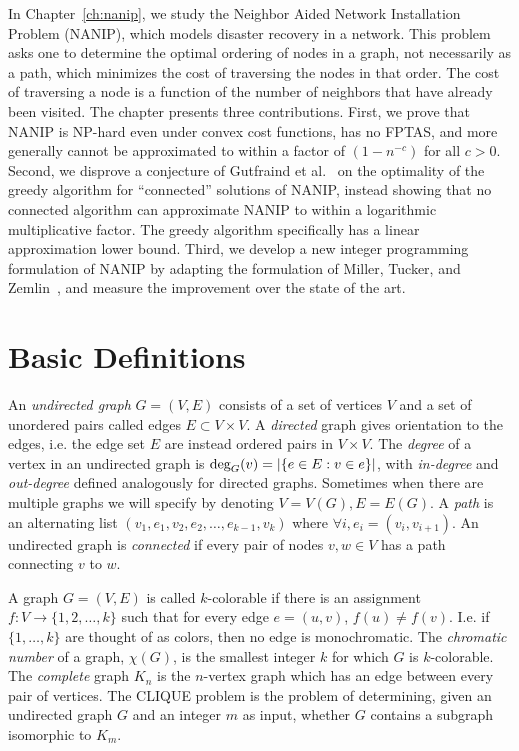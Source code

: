 In Chapter~\ref{ch:nanip}, we study the Neighbor Aided Network Installation
Problem (NANIP), which models disaster recovery in a network. This problem asks
one to determine the optimal ordering of nodes in a graph, not necessarily as a
path, which minimizes the cost of traversing the nodes in that order. The cost
of traversing a node is a function of the number of neighbors that have already
been visited. The chapter presents three contributions. First, we prove that
NANIP is NP-hard even under convex cost functions, has no FPTAS, and more
generally cannot be approximated to within a factor of $(1-n^{-c})$ for all
$c>0$. Second, we disprove a conjecture of Gutfraind et al.~\cite{Gutfraind14}
on the optimality of the greedy algorithm for ``connected'' solutions of NANIP,
instead showing that no connected algorithm can approximate NANIP to within a
logarithmic multiplicative factor. The greedy algorithm specifically has a
linear approximation lower bound. Third, we develop a new integer programming
formulation of NANIP by adapting the formulation of Miller, Tucker, and
Zemlin~\cite{miller1960integer}, and measure the improvement over the state of
the art.~\cite{Gutfraind14}
 
\section{Basic Definitions}

An \emph{undirected graph} $G = (V,E)$ consists of a set of vertices $V$ and a
set of unordered pairs called edges $E \subset V \times V$. A \emph{directed}
graph gives orientation to the edges, i.e. the edge set $E$ are instead ordered
pairs in $V \times V$. The \emph{degree} of a vertex in an undirected graph is
$\textup{deg}_G(v) = |\{e \in E : v \in e \}|$, with \emph{in-degree} and
\emph{out-degree} defined analogously for directed graphs. Sometimes when there
are multiple graphs we will specify by denoting $V = V(G), E = E(G)$. A
\emph{path} is an alternating list $(v_1, e_1, v_2, e_2, \dots, e_{k-1}, v_k)$
where $\forall i, e_i = (v_i,v_{i+1})$. An undirected graph is \emph{connected}
if every pair of nodes $v,w \in V$ has a path connecting $v$ to $w$.

A graph $G = (V,E)$ is called $k$-colorable if there is an assignment $f:V \to \{
1, 2, \dots, k \}$ such that for every edge $e = (u,v)$, $f(u) \neq f(v)$. I.e.
if $\{1,\dots, k\}$ are thought of as colors, then no edge is monochromatic.
The \emph{chromatic number} of a graph, $\chi(G)$, is the smallest integer $k$
for which $G$ is $k$-colorable. The \emph{complete} graph $K_n$ is the
$n$-vertex graph which has an edge between every pair of vertices. The CLIQUE
problem is the problem of determining, given an undirected graph $G$ and an
integer $m$ as input, whether $G$ contains a subgraph isomorphic to $K_m$.

